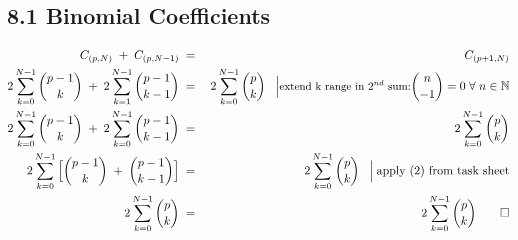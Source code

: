 \documentclass[10pt,a4paper]{article}
\begin{document}
\pagestyle{fancy}

\subsection*{8.1 Binomial Coefficients}

\begin{eqnarray}C_{(p,N)}\;+\;C_{(p,N-1)}\;&=&\;C_{(p+1,N)} \\
2 \sum_{k=0}^{N-1} {p-1 \choose k} \;+\; 2 \sum_{k=1}^{N-1} {p-1 \choose k-1} \;&=&\; 2 \sum_{k=0}^{N-1} {p \choose k} \;\;\;\Big{|}\mbox{\small{extend k range in $2^{nd}$ sum:}} {n \choose -1} = 0\; \forall\; n \in \mathbb{N} \\
2 \sum_{k=0}^{N-1} {p-1 \choose k} \;+\; 2 \sum_{k=0}^{N-1} {p-1 \choose k-1}  \;&=&\; 2 \sum_{k=0}^{N-1} {p \choose k} \\
2 \sum_{k=0}^{N-1}\Big{[} {p-1 \choose k} \;+\; {p-1 \choose k-1} \Big{]} \;&=&\; 2 \sum_{k=0}^{N-1} {p \choose k} \;\;\;\Big{|} \; \mbox{apply (2) from task sheet} \\
2 \sum_{k=0}^{N-1} {p \choose k} \;&=&\; 2 \sum_{k=0}^{N-1} {p \choose k} \qed
\end{eqnarray}
\noindent

\end{document}
